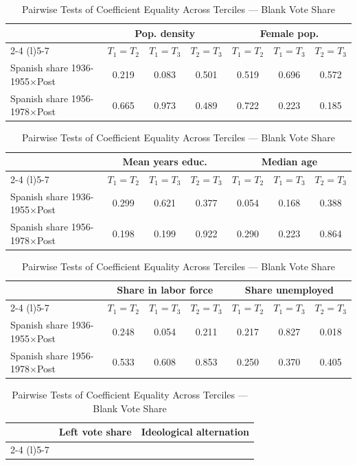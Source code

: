 \begin{table}[!h]
\centering
\renewcommand{\arraystretch}{1.15}
\setlength{\tabcolsep}{4pt}
\caption{Pairwise Tests of Coefficient Equality Across Terciles — Blank Vote Share}
\begin{tabular*}{\textwidth}{l@{\extracolsep{\fill}}cccccc}
\hline
 & \multicolumn{3}{c}{Pop. density} & \multicolumn{3}{c}{Female pop.} \\
\cmidrule(l){2-4} \cmidrule(l){5-7}
 & $T_1 = T_2$ & $T_1 = T_3$ & $T_2 = T_3$ & $T_1 = T_2$ & $T_1 = T_3$ & $T_2 = T_3$ \\
\hline
Spanish share 1936-1955$\times$Post & 0.219 & 0.083 & 0.501 & 0.519 & 0.696 & 0.572 \\
Spanish share 1956-1978$\times$Post & 0.665 & 0.973 & 0.489 & 0.722 & 0.223 & 0.185 \\
\hline
\end{tabular*}
\begin{tabular*}{\textwidth}{l@{\extracolsep{\fill}}cccccc}
 & \multicolumn{3}{c}{Mean years educ.} & \multicolumn{3}{c}{Median age} \\
\cmidrule(l){2-4} \cmidrule(l){5-7}
 & $T_1 = T_2$ & $T_1 = T_3$ & $T_2 = T_3$ & $T_1 = T_2$ & $T_1 = T_3$ & $T_2 = T_3$ \\
\hline
Spanish share 1936-1955$\times$Post & 0.299 & 0.621 & 0.377 & 0.054 & 0.168 & 0.388 \\
Spanish share 1956-1978$\times$Post & 0.198 & 0.199 & 0.922 & 0.290 & 0.223 & 0.864 \\
\hline
\end{tabular*}
\begin{tabular*}{\textwidth}{l@{\extracolsep{\fill}}cccccc}
 & \multicolumn{3}{c}{Share in labor force} & \multicolumn{3}{c}{Share unemployed} \\
\cmidrule(l){2-4} \cmidrule(l){5-7}
 & $T_1 = T_2$ & $T_1 = T_3$ & $T_2 = T_3$ & $T_1 = T_2$ & $T_1 = T_3$ & $T_2 = T_3$ \\
\hline
Spanish share 1936-1955$\times$Post & 0.248 & 0.054 & 0.211 & 0.217 & 0.827 & 0.018 \\
Spanish share 1956-1978$\times$Post & 0.533 & 0.608 & 0.853 & 0.250 & 0.370 & 0.405 \\
\hline
\end{tabular*}
\begin{tabular*}{\textwidth}{l@{\extracolsep{\fill}}cccccc}
 & \multicolumn{3}{c}{Left vote share} & \multicolumn{3}{c}{Ideological alternation} \\
\cmidrule(l){2-4} \cmidrule(l){5-7}

\end{tabular*}
\end{table}
